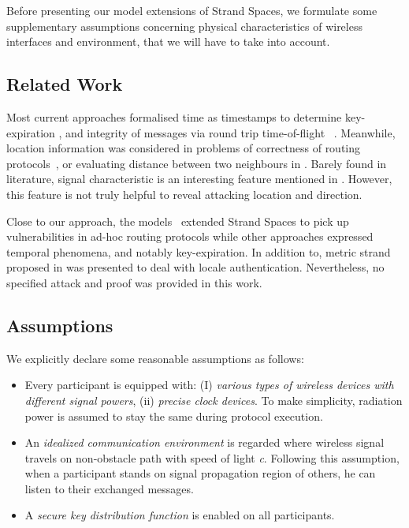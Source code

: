 Before presenting our model extensions of Strand Spaces, we formulate some supplementary assumptions concerning physical characteristics of wireless interfaces and environment, that we will have to take into account. 

\subsection{Related Work}

Most current approaches formalised time as timestamps to determine key-expiration \cite{Li:2007:ESS:1338438.1338469} , and integrity of messages via round trip time-of-flight ~\cite{Poturalski:2008:TPS:1456396.1456400, RaphaelJamet}. Meanwhile, location information was considered in problems of correctness of routing protocols~\cite{5230621,Basin:2009:LGP:1616077.1616079}, or evaluating distance between two neighbours in \cite{Poturalski:2008:TPS:1456396.1456400}. Barely found in literature, signal characteristic is an interesting feature mentioned in \cite{Poturalski:2008:TPS:1456396.1456400}. However, this feature is not truly helpful to reveal attacking location and direction. 

Close to our approach, the models~\cite{Yang03modelingvulnerabilities, 4481351} extended Strand Spaces to pick up vulnerabilities in ad-hoc routing protocols while other approaches \cite{Li:2007:ESS:1338438.1338469, Sharp:2007:TTS:2391910.2391948} expressed temporal phenomena, and notably key-expiration. In addition to, metric strand proposed in \cite{Thayer:2010aa} was presented to deal with locale authentication. Nevertheless, no specified attack and proof was provided in this work. 

\subsection{Assumptions}

We explicitly declare some reasonable assumptions as follows:
\begin{itemize}
\item Every participant is equipped with: (I) \textit{various types of wireless devices with different signal powers}, (ii) \textit{precise clock devices}. To make simplicity, radiation power is assumed to stay the same during protocol execution.
\item An \textit{idealized communication environment} is regarded where wireless signal travels on non-obstacle path with speed of light \emph{c}. Following this assumption, when a participant stands on signal propagation region of others, he can listen to their exchanged messages. 
\item A \textit{secure key distribution function} is enabled on all participants. 
\end{itemize}


